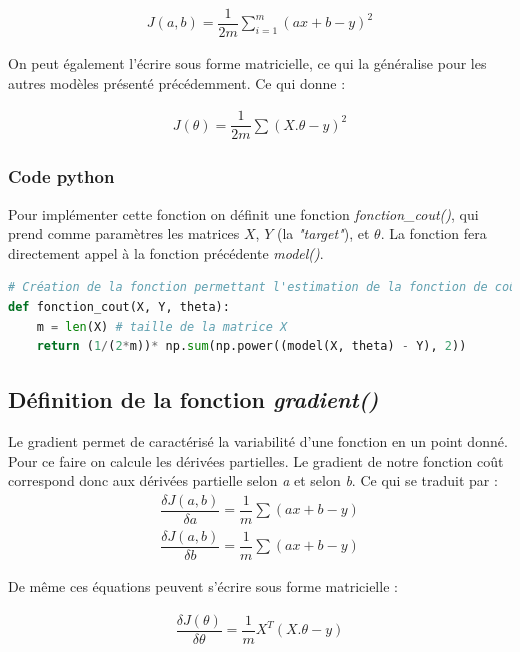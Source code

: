 \documentclass[french]{article}
\begin{document}
\begin{align*}
    J(a,b) = \dfrac{1}{2m}\sum_{i=1}^{m}(ax + b - y)^2
\end{align*}

\noindent On peut également l'écrire sous forme matricielle, ce qui la généralise pour les autres modèles présenté précédemment. Ce qui donne :

\begin{align*}
    J(\theta) = \dfrac{1}{2m}\sum(X.\theta - y)^2
\end{align*}

\subsubsection{Code python}

\noindent Pour implémenter cette fonction on définit une fonction \textit{fonction\_cout()}, qui prend comme paramètres les matrices $X$, $Y$ (la \textit{"target"}), et $\theta$. La fonction fera directement appel à la fonction précédente \textit{model()}.

\begin{lstlisting}[language=Python]
# Création de la fonction permettant l'estimation de la fonction de coût
def fonction_cout(X, Y, theta):
    m = len(X) # taille de la matrice X
    return (1/(2*m))* np.sum(np.power((model(X, theta) - Y), 2))
\end{lstlisting}

\subsection{Définition de la fonction \textit{gradient()}}
Le gradient permet de caractérisé la variabilité d'une fonction en un point donné. Pour ce faire on calcule les dérivées partielles. Le gradient de notre fonction coût correspond donc aux dérivées partielle selon \textit{a} et selon \textit{b}. Ce qui se traduit par :
\begin{align*}
    \dfrac{\delta J(a,b)}{\delta a} = \dfrac{1}{m}\sum(ax + b - y) \\
    \dfrac{\delta J(a,b)}{\delta b} = \dfrac{1}{m}\sum(ax + b - y)
\end{align*}

\noindent De même ces équations peuvent s'écrire sous forme matricielle :

\begin{align*}
    \dfrac{\delta J(\theta)}{\delta \theta} = \dfrac{1}{m}X^{T}(X.\theta - y)
\end{align*}
\end{document}
